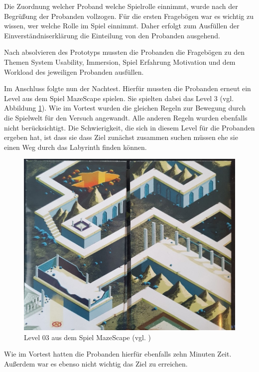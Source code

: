 Die Zuordnung welcher Proband welche Spielrolle einnimmt, wurde nach der Begrüßung der Probanden vollzogen. Für die ersten Fragebögen war es wichtig zu wissen, wer welche Rolle im Spiel einnimmt. Daher erfolgt zum Ausfüllen der Einverständniserklärung die Einteilung von den Probanden ausgehend.

Nach absolvieren des Prototyps mussten die Probanden die Fragebögen zu den Themen System Usability, Immersion, Spiel Erfahrung Motivation und dem Workload des jeweiligen Probanden ausfüllen.

Im Anschluss folgte nun der Nachtest. Hierfür mussten die Probanden erneut ein Level aus dem Spiel MazeScape spielen. Sie spielten dabei das Level 3 (vgl. Abbildung \ref{fig:mazescape_level-03}). Wie im Vortest wurden die gleichen Regeln zur Bewegung durch die Spielwelt für den Versuch angewandt. Alle anderen Regeln wurden ebenfalls nicht berücksichtigt. Die Schwierigkeit, die sich in diesem Level für die Probanden ergeben hat, ist dass sie dass Ziel zunächst zusammen suchen müssen ehe sie einen Weg durch das Labyrinth finden können.

\begin{figure}[ht]
\centering
\includegraphics[width=1\linewidth]{content/pictures/MazeScape_Level03.jpg}
\caption{Level 03 aus dem Spiel MazeScape (vgl. \cite{noauthor_mazescape_nodate})}
\label{fig:mazescape_level-03}
\end{figure}

Wie im Vortest hatten die Probanden hierfür ebenfalls zehn Minuten Zeit. Außerdem war es ebenso nicht wichtig das Ziel zu erreichen.

